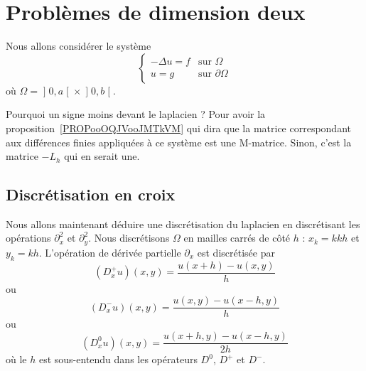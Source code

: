	\section{Problèmes de dimension deux}


	Nous allons considérer le système
	\begin{equation}                \label{SYSooTANLooRgnIMp}
		\begin{cases}
			-\Delta u=f & \text{sur } \Omega         \\
			u=g         & \text{sur } \partial\Omega
		\end{cases}
	\end{equation}
	où \( \Omega=\mathopen] 0 , a \mathclose[\times \mathopen] 0 , b \mathclose[\).

\begin{remark}
	Pourquoi un signe moins devant le laplacien ? Pour avoir la proposition~\ref{PROPooOQJVooJMTkVM} qui dira que la matrice correspondant aux différences finies appliquées à ce système est une M-matrice. Sinon, c'est la matrice \(-L_h\) qui en serait une.
\end{remark}

\subsection{Discrétisation en croix}

Nous allons maintenant déduire une discrétisation du laplacien en discrétisant les opérations \( \partial^2_x\) et \( \partial^2_y\). Nous discrétisons \( \Omega\) en mailles carrés de côté \( h\) : \( x_k=kkh\) et \( y_k=kh\). L'opération de dérivée partielle \( \partial_x\) est discrétisée par
\begin{equation}
	(D_x^+u)(x,y)=\frac{ u(x+h)-u(x,y) }{ h }
\end{equation}
ou
\begin{equation}
	(D_x^-u)(x,y)=\frac{ u(x,y)-u(x-h,y) }{ h }
\end{equation}
ou
\begin{equation}
	(D^0_xu)(x,y)=\frac{ u(x+h,y)-u(x-h,y) }{ 2h }
\end{equation}
où le \( h\) est sous-entendu dans les opérateurs \( D^0\), \( D^+\) et \( D^-\).

